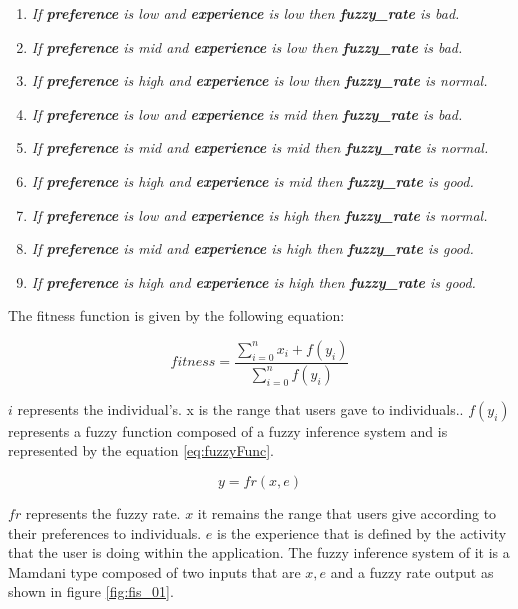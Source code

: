 \begin{enumerate}
	\item \textit{If \textbf{preference} is low and 
		\textbf{experience} is low then \textbf{fuzzy\_rate} is bad.}
	\item \textit{If \textbf{preference} is mid and 
		\textbf{experience} is low  then \textbf{fuzzy\_rate} is bad.}
	\item \textit{If \textbf{preference} is high and 
		\textbf{experience} is low  then \textbf{fuzzy\_rate} is normal.}
	\item \textit{If \textbf{preference} is low and 
		\textbf{experience} is mid then \textbf{fuzzy\_rate} is bad.}
	\item \textit{If \textbf{preference} is mid and 
		\textbf{experience} is mid  then \textbf{fuzzy\_rate} is normal.}
	\item \textit{If \textbf{preference} is high and 
		\textbf{experience} is mid  then \textbf{fuzzy\_rate} is good.}
	\item \textit{If \textbf{preference} is low and 
		\textbf{experience} is high then \textbf{fuzzy\_rate} is normal.}
	\item \textit{If \textbf{preference} is mid and 
		\textbf{experience} is high  then \textbf{fuzzy\_rate} is good.}
	\item \textit{If \textbf{preference} is high and 
		\textbf{experience} is high  then \textbf{fuzzy\_rate} is good.}
		
\end{enumerate}

The fitness function is given by the following equation:

\begin{equation}\label{eq:fitfunc02}
\displaystyle fitness=\frac{\sum_{i=0}^{n}x_{i}+f(y_{i})}{\sum_{i=0}^{n}f(y_{i})}
\end{equation}

$i$ represents the individual's. x is the range that users gave to individuals..
$f(y_i)$ represents a fuzzy function composed of a fuzzy inference system and is
represented by the equation \ref{eq:fuzzyFunc}.

\begin{equation}\label{eq:fuzzyFunc}
\displaystyle y=fr(x,e)
\end{equation}


$fr$ represents the fuzzy rate.  
$x$ it remains the range that users give according to their preferences to individuals. 
$e$  is the experience that is defined by the
activity that the user is doing within the application. The fuzzy inference system of it is a Mamdani type composed of two inputs that are  $x,e$ and a fuzzy rate output as shown in figure \ref{fig:fis_01}.


